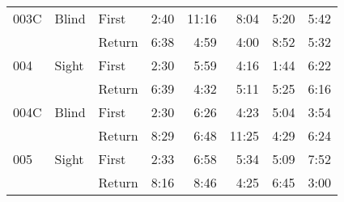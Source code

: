 \begin{table}[!htb]
\begin{tabular}{lllrrrrr}
003C & Blind & First &   2:40 &  11:16 &                                                  8:04 &                                                   5:20 &    5:42 \\
    &       & Return &   6:38 &   4:59 &                                                  4:00 &                                                   8:52 &    5:32 \\
004 & Sight & First &   2:30 &   5:59 &                                                  4:16 &                                                   1:44 &    6:22 \\
    &       & Return &   6:39 &   4:32 &                                                  5:11 &                                                   5:25 &    6:16 \\
004C & Blind & First &   2:30 &   6:26 &                                                  4:23 &                                                   5:04 &    3:54 \\
    &       & Return &   8:29 &   6:48 &                                                 11:25 &                                                   4:29 &    6:24 \\
005 & Sight & First &   2:33 &   6:58 &                                                  5:34 &                                                   5:09 &    7:52 \\
    &       & Return &   8:16 &   8:46 &                                                  4:25 &                                                   6:45 &    3:00 \\
\bottomrule
\end{tabular}
\end{table}


